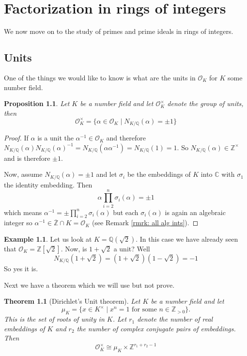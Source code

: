 \documentclass[11pt,a4paper]{report}
\theoremstyle{plain}
\newtheorem{thm}[subsection]{Theorem}
\newtheorem{prop}[subsection]{Proposition}
\theoremstyle{definition}
\newtheorem{exmp}[subsection]{Example}
\theoremstyle{definition}
\newcommand{\ZZ}{\mathbb{Z}}
\def\CC{\mathbb{C}}
\def\QQ{\mathbb{Q}}
\def \a{\alpha}
\def \OO {\mathcal{O}}
\def \ov{\overline}
\begin{document}
\chapter{Factorization in rings of integers}

We now move on to the study of primes and prime ideals in rings of integers.

\section{Units}



One of the things we would like to know is what are the units in $\OO_K$ for $K$ some number field. 

\begin{prop}
Let $K$ be a number field and let $\OO_K^\times$ denote the group of units, then \[\OO_K^\times=\{\a \in \OO_K \mid N_{K/\QQ}(\a)=\pm 1\} \]
\end{prop}

\begin{proof}
If $\a$ is a unit the $\a^{-1} \in \OO_K$ and therefore $N_{K/\QQ}(\a)N_{K/\QQ}(\a)^{-1}=N_{K/\QQ}(\a \a^{-1})=N_{K/\QQ}(1)=1$. So $N_{K/\QQ}(\a) \in \ZZ^\times$ and is therefore $\pm 1$.

Now, assume $N_{K/\QQ}(\a)=\pm 1$ and let $\sigma_i$ be the embeddings of $K$ into $\CC$ with $\sigma_1$ the identity embedding. Then \[\a \prod_{i=2}^n \sigma_i(\a)=\pm 1 \] which means $\a^{-1}=\pm \prod_{i=2}^n \sigma_i(\a)$ but each $\sigma_i(\a)$ is again an algebraic integer so $ \a^{-1} \in \ov{\ZZ} \cap K=\OO_K$ (see Remark \ref{rmrk: all alg ints}).

\end{proof}



\begin{exmp}
Let us look at $K=\QQ(\sqrt{2})$. In this case we have already seen that $\OO_K=\ZZ[\sqrt{2}]$. Now, is $1+\sqrt{2}$ a unit? Well \[N_{K/\QQ}(1+\sqrt{2})=(1+\sqrt{2})(1-\sqrt{2})=-1\] So yes it is.
\end{exmp}

Next we have a theorem which we will use but not prove.
\begin{thm}[Dirichlet's Unit theorem]\label{thm: dir unit thm}
Let $K$ be a number field and let \[\mu_K=\{x \in K^\times \mid x^n=1 \text{ for some } n  \in \ZZ_{> 0}\}.\] This is the set of roots of unity in $K$. Let $r_1$ denote the number of real embeddings of $K$ and $r_2$ the number of complex conjugate pairs of embeddings. Then \[\OO_K^{\times} \cong \mu_K \times \ZZ^{r_1+r_2-1}\]
\end{thm}
\end{document}
